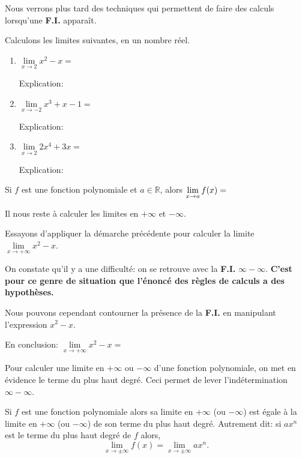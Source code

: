 \documentclass[a4paper,12pt]{report}
\newcommand{\IR}{\mathbb{R}}
\newcommand{\pinf}{+\infty}
\newcommand{\minf}{-\infty}
\newcommand{\pminf}{\pm\infty}
\newcommand{\FI}{\textbf{F.I.}}
\begin{document}
Nous verrons plus tard des techniques qui permettent de faire des
calculs lorsqu'une \FI{} apparaît.


\begin{exemple}
Calculons les limites suivantes, en un nombre réel.

\begin{enumerate}
\item \(\lim\limits_{x\to 2}x^2-x=\) \dotfill

Explication:\vspace{3cm}
\item \(\lim\limits_{x\to -2}x^3+x-1=\) \dotfill

Explication:\vspace{3cm}
\item \(\lim\limits_{x\to 2}2x^4+3x=\) \dotfill

Explication:\vspace{3cm}
\end{enumerate}
\end{exemple}

\begin{propriete}
Si \(f\) est une fonction polynomiale et \(a\in\IR\), alors
\(\lim\limits_{x\to a}f(x)=\dotfill\)
\end{propriete}

Il nous reste à calculer les limites en \(\pinf\) et \(\minf\).

\begin{exemple}
Essayons d'appliquer la démarche précédente pour calculer la limite
 \(\lim\limits_{x\to \pinf}x^2-x\).
 \vspace{3cm}

On constate qu'il y a une difficulté: on se retrouve avec la
\FI{}  \(\infty-\infty\). \textbf{C'est pour ce genre de situation que
l'énoncé des règles de calculs a des hypothèses.}

Nous pouvons cependant contourner la présence de la \FI{} en
manipulant l'expression \(x^2-x\).
\vspace{5cm}

En conclusion: \(\lim\limits_{x\to \pinf}x^2-x=\) \dotfill
\end{exemple}

\begin{methode}
Pour calculer une limite en \(\pinf\) ou \(\minf\) d'une fonction
polynomiale, on met en évidence le terme du plus haut degré. Ceci
permet de lever l'indétermination \(\infty-\infty\).
\end{methode}

\begin{propriete}
Si \(f\) est une fonction polynomiale alors sa limite en \(\pinf\) (ou
\(\minf\)) est égale à la limite en \(\pinf\) (ou \(\minf\)) de son terme du
plus haut degré. Autrement dit: si \(ax^n\) est le terme du plus haut
degré de \(f\) alors,
\[
\lim\limits_{x\to\pminf}f(x)=\lim\limits_{x\to\pminf}ax^n.
\]
\end{propriete}
\end{document}
